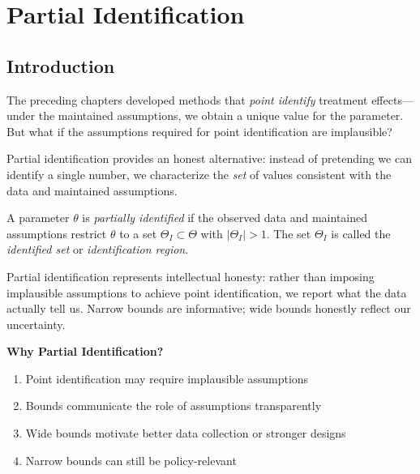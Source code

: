 
\chapter{Partial Identification}
\label{ch:bounds}

\section{Introduction}
\label{sec:bounds_intro}

The preceding chapters developed methods that \emph{point identify} treatment effects---under the maintained assumptions, we obtain a unique value for the parameter. But what if the assumptions required for point identification are implausible?

Partial identification provides an honest alternative: instead of pretending we can identify a single number, we characterize the \emph{set} of values consistent with the data and maintained assumptions.

\begin{definition}
\label{def:partial_id}
A parameter $\theta$ is \emph{partially identified} if the observed data and maintained assumptions restrict $\theta$ to a set $\Theta_I \subset \Theta$ with $|\Theta_I| > 1$. The set $\Theta_I$ is called the \emph{identified set} or \emph{identification region}.
\end{definition}

\begin{insight}
Partial identification represents intellectual honesty: rather than imposing implausible assumptions to achieve point identification, we report what the data actually tell us. Narrow bounds are informative; wide bounds honestly reflect our uncertainty.
\end{insight}

\textbf{Why Partial Identification?}
\begin{enumerate}
    \item Point identification may require implausible assumptions
    \item Bounds communicate the role of assumptions transparently
    \item Wide bounds motivate better data collection or stronger designs
    \item Narrow bounds can still be policy-relevant
\end{enumerate}

